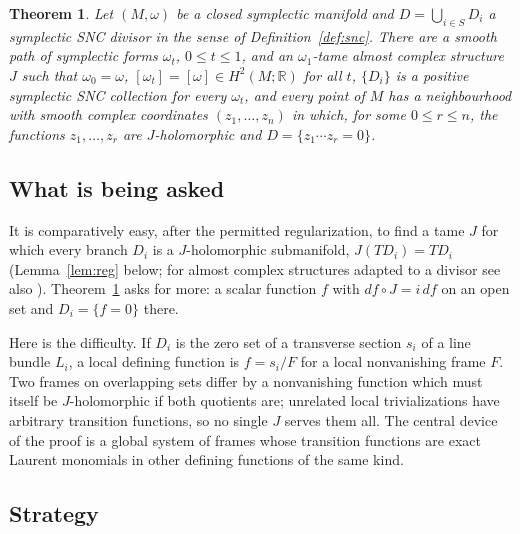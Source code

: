 \documentclass[11pt]{article}
\newtheorem{theorem}{Theorem}
\theoremstyle{remark}
\newcommand{\R}{\mathbb R}
\begin{document}
\begin{theorem}\label{thm:main}
Let $(M,\omega)$ be a closed symplectic manifold and $D=\bigcup_{i\in S}D_i$
a symplectic SNC divisor in the sense of Definition~\ref{def:snc}. There
are a smooth path of symplectic forms $\omega_t$, $0\le t\le1$, and an
$\omega_1$-tame almost complex structure $J$ such that $\omega_0=\omega$,
$[\omega_t]=[\omega]\in H^2(M;\R)$ for all $t$, $\{D_i\}$ is a positive
symplectic SNC collection for every $\omega_t$, and every point of $M$
has a neighbourhood with smooth complex coordinates $(z_1,\dots,z_n)$
in which, for some $0\le r\le n$, the functions $z_1,\dots,z_r$ are
$J$-holomorphic and $D=\{z_1\cdots z_r=0\}$.
\end{theorem}

\subsection*{What is being asked}

It is comparatively easy, after the permitted regularization, to find
a tame $J$ for which every branch $D_i$ is a $J$-holomorphic
submanifold, $J(TD_i)=TD_i$ (Lemma~\ref{lem:reg} below; for almost
complex structures adapted to a divisor see also \cite[Section 3]{FZ}).
Theorem~\ref{thm:main} asks for more: a scalar function $f$ with
$df\circ J=i\,df$ on an open set and $D_i=\{f=0\}$ there.

Here is the difficulty. If $D_i$ is the zero set of a transverse
section $s_i$ of a line bundle $L_i$, a local defining function is
$f=s_i/F$ for a local nonvanishing frame $F$. Two frames on
overlapping sets differ by a nonvanishing function which must itself be
$J$-holomorphic if both quotients are; unrelated local trivializations
have arbitrary transition functions, so no single $J$ serves them all.
The central device of the proof is a global system of frames whose
transition functions are exact Laurent monomials in other defining
functions of the same kind.

\subsection*{Strategy}
\end{document}
